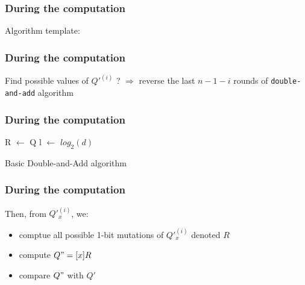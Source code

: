 \documentclass{beamer}
\begin{document}
    \begin{frame}
        \frametitle{During the computation}
        Algorithm template:

    \end{frame}

    \begin{frame}
        \frametitle{During the computation}
        Find possible values of $Q'^{(i)}$ ? $\Rightarrow$ reverse the last $n-1-i$ rounds of {\tt double-and-add} algorithm
    \end{frame}


    \begin{frame}
        \frametitle{During the computation}
        \begin{center}
            \begin{algorithm}[H]
                \footnotesize
                \SetAlgoLined %
               
                \SetSideCommentLeft 
                \SetNoFillComment
            
                
                
                R $\leftarrow$ Q\;
                l $\leftarrow$ $log_2(d)$\;
            
                \bigskip
            
                \caption{Basic Double-and-Add algorithm}
                \label{rev-d-and-a-algo}
            
            \end{algorithm}
        \end{center}
    \end{frame}

    \begin{frame}
        \frametitle{During the computation}
        Then, from $Q'_x^{(i)}$, we:
        \begin{itemize}
            \item \color{black} { comptue all possible 1-bit mutations of $Q'_x^(i)$ denoted $R$ }
            \item \color{black} { compute $Q" = [x]R$}
            \item \color{black} { compare $Q"$ with $Q'$}
        \end{itemize}
    \end{frame}
\end{document}
